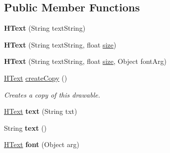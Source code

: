 \subsection*{Public Member Functions}
\begin{DoxyCompactItemize}
\item 
\hypertarget{classhype_1_1extended_1_1drawable_1_1_h_text_a10f347f430a4768cda74e6a89446acd3}{{\bfseries H\-Text} (String text\-String)}\label{classhype_1_1extended_1_1drawable_1_1_h_text_a10f347f430a4768cda74e6a89446acd3}

\item 
\hypertarget{classhype_1_1extended_1_1drawable_1_1_h_text_a6b3d7b5d9ced252e0aff9fc0a9a030c3}{{\bfseries H\-Text} (String text\-String, float \hyperlink{classhype_1_1core_1_1drawable_1_1_h_drawable_ae046413f91234f66dde997ef02908e24}{size})}\label{classhype_1_1extended_1_1drawable_1_1_h_text_a6b3d7b5d9ced252e0aff9fc0a9a030c3}

\item 
\hypertarget{classhype_1_1extended_1_1drawable_1_1_h_text_ad63046fd4f5711d22f0955852f879321}{{\bfseries H\-Text} (String text\-String, float \hyperlink{classhype_1_1core_1_1drawable_1_1_h_drawable_ae046413f91234f66dde997ef02908e24}{size}, Object font\-Arg)}\label{classhype_1_1extended_1_1drawable_1_1_h_text_ad63046fd4f5711d22f0955852f879321}

\item 
\hyperlink{classhype_1_1extended_1_1drawable_1_1_h_text}{H\-Text} \hyperlink{classhype_1_1extended_1_1drawable_1_1_h_text_a039666248c6ade37e57319f9a9671145}{create\-Copy} ()
\begin{DoxyCompactList}\small\item\em Creates a copy of this drawable. \end{DoxyCompactList}\item 
\hypertarget{classhype_1_1extended_1_1drawable_1_1_h_text_a328bd07a58d5bcf9c5138d8b020ab254}{\hyperlink{classhype_1_1extended_1_1drawable_1_1_h_text}{H\-Text} {\bfseries text} (String txt)}\label{classhype_1_1extended_1_1drawable_1_1_h_text_a328bd07a58d5bcf9c5138d8b020ab254}

\item 
\hypertarget{classhype_1_1extended_1_1drawable_1_1_h_text_acb1701d0f2be5d7ad9dd8187e31a31ed}{String {\bfseries text} ()}\label{classhype_1_1extended_1_1drawable_1_1_h_text_acb1701d0f2be5d7ad9dd8187e31a31ed}

\item 
\hypertarget{classhype_1_1extended_1_1drawable_1_1_h_text_a9ea7adebffc7882b853584dd9c37d443}{\hyperlink{classhype_1_1extended_1_1drawable_1_1_h_text}{H\-Text} {\bfseries font} (Object arg)}\label{classhype_1_1extended_1_1drawable_1_1_h_text_a9ea7adebffc7882b853584dd9c37d443}


\end{DoxyCompactItemize}
